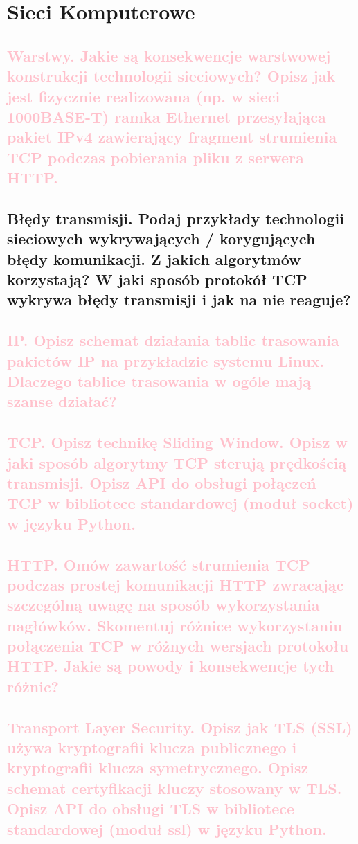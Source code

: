 \chapter{Sieci Komputerowe}

\section{\textcolor{pink}{Warstwy. Jakie są konsekwencje warstwowej konstrukcji technologii sieciowych? Opisz jak jest fizycznie realizowana (np. w sieci 1000BASE-T) ramka Ethernet przesyłająca pakiet IPv4 zawierający fragment strumienia TCP podczas pobierania pliku z serwera HTTP.}}

\section{Błędy transmisji. Podaj przykłady technologii sieciowych wykrywających / korygujących błędy komunikacji. Z jakich algorytmów korzystają? W jaki sposób protokół TCP wykrywa błędy transmisji i jak na nie reaguje?}


\section{\textcolor{pink}{IP. Opisz schemat działania tablic trasowania pakietów IP na przykładzie systemu Linux. Dlaczego tablice trasowania w ogóle mają szanse działać?}}

\section{\textcolor{pink}{TCP. Opisz technikę Sliding Window. Opisz w jaki sposób algorytmy TCP sterują prędkością transmisji. Opisz API do obsługi połączeń TCP w bibliotece standardowej (moduł socket) w języku Python.}}

\section{\textcolor{pink}{HTTP. Omów zawartość strumienia TCP podczas prostej komunikacji HTTP zwracając szczególną uwagę na sposób wykorzystania nagłówków. Skomentuj różnice wykorzystaniu połączenia TCP w różnych wersjach protokołu HTTP. Jakie są powody i konsekwencje tych różnic?}}

\section{\textcolor{pink}{Transport Layer Security. Opisz jak TLS (SSL) używa kryptografii klucza publicznego i kryptografii klucza symetrycznego. Opisz schemat certyfikacji kluczy stosowany w TLS. Opisz API do obsługi TLS w bibliotece standardowej (moduł ssl) w języku Python.}}